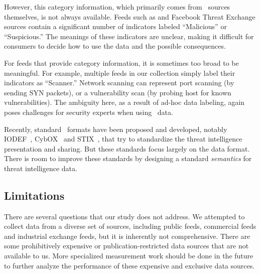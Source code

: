 However, this category information, which primarily comes from \ti\ sources
themselves, is not always available. Feeds such as {\feedalienvault} and
Facebook Threat Exchange sources contain a significant number
of indicators labeled ``Malicious'' or ``Suspicious.'' The meanings of
these indicators are unclear, making it difficult for consumers to decide
how to use the data and the possible consequences.

For feeds that provide category information, it is sometimes too broad
to be meaningful. For example, multiple feeds in our collection
simply label their indicators as ``Scanner.'' Network scanning can
represent port scanning (by sending SYN packets), or a vulnerability scan (by
probing host for known vulnerabilities). The ambiguity here, as a result of
ad-hoc data labeling, again poses challenges for security experts when using
\ti\ data.

Recently, standard \ti\ formats have been proposed and developed, notably
IODEF~\cite{IODEF}, CybOX~\cite{CybOX} and STIX~\cite{STIX}, that try to
standardize the threat intelligence presentation and sharing. But these
standards focus largely on the data format. There is room
to improve these standards by designing a standard \emph{semantics} for threat
intelligence data.



\subsection{Limitations}
There are several questions that our study does not address. We attempted to collect data from a diverse set of
sources, including public feeds, commercial feeds and industrial exchange feeds,
but it is inherently not comprehensive. There are some prohibitively expensive or
publication-restricted data sources that are not available to us. More specialized measurement
work should be done in the future to further analyze the performance of these
expensive and exclusive data sources.

